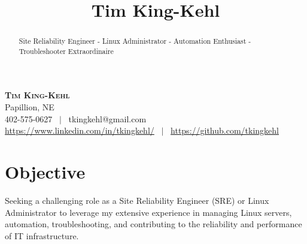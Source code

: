 \documentclass[10pt, a4paper]{article}
\title{\textbf{Tim King-Kehl}}
\date{}
\begin{document}
\begin{center}
    \textbf{\Huge \scshape Tim King-Kehl} \\ \vspace{1pt}
    Papillion, NE \\ \vspace{1pt}
     402-575-0627 \ $|$ \ tkingkehl@gmail.com \\ \vspace{1pt} 
     \url{https://www.linkedin.com/in/tkingkehl/} \ $|$ \ \url{https://github.com/tkingkehl} \\ \vspace{1pt} 
\end{center}
\begin{abstract}
Site Reliability Engineer - Linux Administrator - Automation Enthusiast - Troubleshooter Extraordinaire
\end{abstract}

\section*{Objective}
Seeking a challenging role as a Site Reliability Engineer (SRE) or Linux Administrator to leverage my extensive experience in managing Linux servers, automation, troubleshooting, and contributing to the reliability and performance of IT infrastructure.
\end{document}
